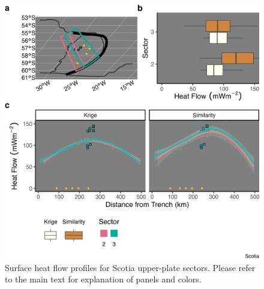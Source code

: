 \begin{figure}[htbp]

{\centering \includegraphics[width=1\linewidth,]{assets/figs/chpt3/ScotiaUpperPlate} 

}

\caption[Surface heat flow profiles for Scotia upper-plate sectors]{Surface heat flow profiles for Scotia upper-plate sectors. Please refer to the main text for explanation of panels and colors.}\label{fig:scotiaUpper}
\end{figure}

